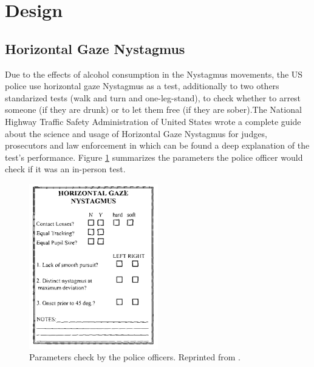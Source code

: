 \section{Design}
\label{design}

\subsection{Horizontal Gaze Nystagmus}

Due to the effects of alcohol consumption in the Nystagmus movements, the US police use horizontal gaze Nystagmus as a test, additionally to two others standarized tests (walk and turn and one-leg-stand), to check whether to arrest someone (if they are drunk) or to let them free (if they are sober).The National Highway Traffic Safety Administration of United States wrote a complete guide about the science and usage of Horizontal Gaze Nystagmus for judges, prosecutors and law enforcement \cite{NystagmusTest} in which can be found a deep explanation of the test's performance. Figure \ref{nystagmus} summarizes the parameters the police officer would check if it was an in-person test.

\begin{figure}[H]
    \centering
    \includegraphics[width=0.5\textwidth]{./img/nystagmus.png}
    \caption{Parameters check by the police officers. Reprinted from \cite{NystagmusTest}.}
    \label{nystagmus}
\end{figure}

